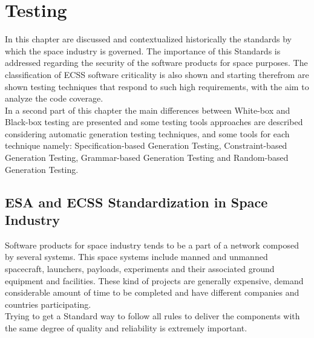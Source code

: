 \cleardoublepage
\chapter{Testing}
\minitoc
In this chapter are discussed and contextualized historically the standards by which the space industry is governed.
The importance of this Standards is addressed regarding the security of the software products for space purposes.
The classification of \ac{ECSS} software criticality is also shown and starting therefrom are shown testing techniques that 
respond to such high requirements, with the aim to analyze the code coverage.\\
In a second part of this chapter the main differences between White-box and Black-box testing are presented and
some testing tools approaches are described considering automatic generation testing techniques, and some tools for each technique namely:
Specification-based Generation Testing, Constraint-based Generation Testing, Grammar-based Generation Testing and
Random-based Generation Testing.
\section{ESA and ECSS Standardization in Space Industry}
Software products for space industry tends to be a part of a network composed by several systems. This space systems include manned and unmanned spacecraft,
launchers, payloads, experiments and their associated ground equipment and facilities\cite{Mattiello-FranciscoSanAmbJogCos:2007:BrSoIn}.
These kind of projects are generally  expensive, demand considerable amount of time to be completed and have different companies and countries participating.\\
Trying to get a Standard way to follow all rules to deliver the components with the same degree of quality and reliability is extremely important.\\

